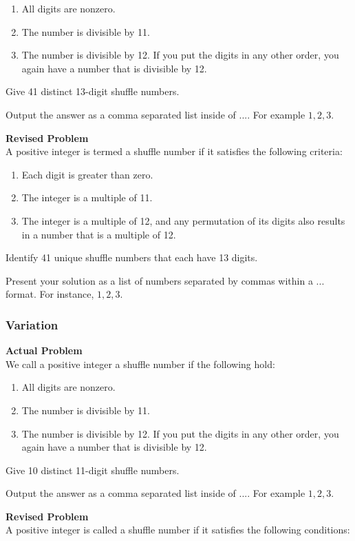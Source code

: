 \begin{enumerate}
\item All digits are nonzero.
\item The number is divisible by 11.
\item The number is divisible by 12. If you put the digits in any other order, you again have a number that is divisible by 12.
\end{enumerate}
Give 41 distinct 13-digit shuffle numbers.

Output the answer as a comma separated list inside of $\boxed{...}$. For example $\boxed{1, 2, 3}$.

\textbf{Revised Problem}\\
A positive integer is termed a shuffle number if it satisfies the following criteria:

\begin{enumerate}
\item Each digit is greater than zero.
\item The integer is a multiple of 11.
\item The integer is a multiple of 12, and any permutation of its digits also results in a number that is a multiple of 12.
\end{enumerate}
Identify 41 unique shuffle numbers that each have 13 digits.

Present your solution as a list of numbers separated by commas within a $\boxed{...}$ format. For instance, $\boxed{1, 2, 3}$.

\subsubsection{Variation}
\textbf{Actual Problem}\\
We call a positive integer a shuffle number if the following hold:

\begin{enumerate}
\item All digits are nonzero.
\item The number is divisible by 11.
\item The number is divisible by 12. If you put the digits in any other order, you again have a number that is divisible by 12.
\end{enumerate}
Give 10 distinct 11-digit shuffle numbers.

Output the answer as a comma separated list inside of $\boxed{...}$. For example $\boxed{1, 2, 3}$.

\textbf{Revised Problem}\\
A positive integer is called a shuffle number if it satisfies the following conditions:

